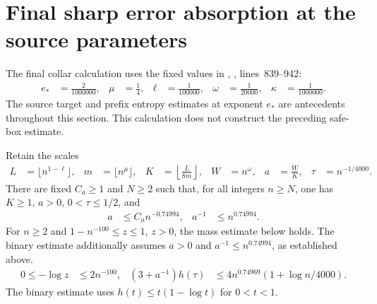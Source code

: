 \section{Final sharp error absorption at the source parameters}
\label{sec:arealaw-final-sharp-scalar}

The final collar calculation uses the fixed values in
\cite{OpenAI2026AreaLaw}, , lines~839--942:
\begin{align}
    e_*    & =\frac{2}{1000000}, &
    \mu    & =\frac14,           &
    \ell   & =\frac1{100000},    &
    \omega & =\frac1{20000},     &
    \kappa & =\frac1{1000000}.
    \label{eq:final_scalar_parameters}
\end{align}
The source target and prefix entropy estimates at exponent $e_*$
are antecedents throughout this section. This calculation does not
construct the preceding safe-box estimate.

\begin{lemma}
    \label{thm:arealaw-final-sharp-scales}
    \leanok
    Retain the scales
    \begin{align}
        L    & =\lfloor n^{1-\ell}\rfloor,             &
        m    & =\lfloor n^\mu\rfloor,                  &
        K    & =\left\lfloor\frac{L}{8m}\right\rfloor, &
        W    & =n^\omega,                              &
        a    & =\frac WK,                              &
        \tau & =n^{-1/4000}.
        \label{eq:final_scalar_scales}
    \end{align}
    There are fixed $C_a\geq1$ and $N\geq2$ such that, for all
    integers $n\geq N$, one has $K\geq1$, $a>0$, $0<\tau\leq1/2$,
    and
    \begin{align}
        a      & \leq C_a n^{-0.74994}, &
        a^{-1} & \leq n^{0.74994}.
        \label{eq:final_scalar_a}
    \end{align}
    For $n\geq2$ and $1-n^{-100}\leq z\leq1$, $z>0$,
    the mass estimate below holds. The binary estimate additionally
    assumes $a>0$ and $a^{-1}\leq n^{0.74994}$, as established above.
    \begin{align}
        0\leq-\log z & \leq2n^{-100},                   &
        (3+a^{-1})h(\tau)
                     & \leq4n^{0.74969}(1+\log n/4000).
        \label{eq:final_scalar_mass_binary}
    \end{align}
    The binary estimate uses $h(t)\leq t(1-\log t)$ for $0<t<1$.
\end{lemma}

